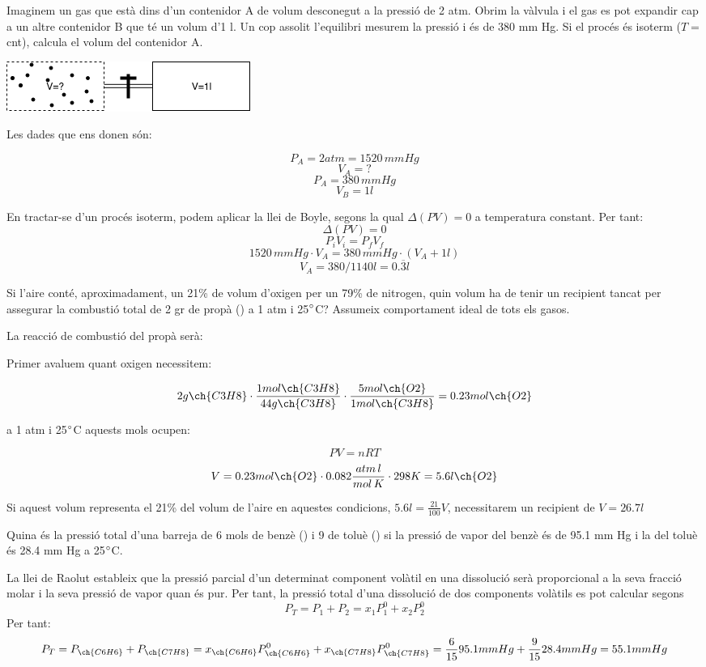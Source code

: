 \documentclass[11pt]{article}
\begin{document}
{Imaginem un gas que està dins d'un contenidor A de volum desconegut a la pressió de 2 atm. Obrim la vàlvula i el gas es pot expandir cap a un altre contenidor B que té un volum d'1 l. Un cop assolit l'equilibri mesurem la pressió i és de 380 mm Hg. Si el procés és isoterm ($T=$cnt), calcula el volum del contenidor A.
\begin{center}
\includegraphics[scale=0.7]{../figures/gas.png}
\end{center}}
{
\vfill
\newpage
}
{
Les dades que ens donen són:

\[P_A=2atm=1520 \,mmHg\]
\[V_A=?\]
\[P_A=380 \,mmHg\]
\[V_B=1l\]

En tractar-se d'un procés isoterm, podem aplicar la llei de Boyle, segons la qual $\Delta (PV)=0$ a temperatura constant.
Per tant:
\[\Delta (PV)=0\]
\[P_i V_i = P_f V_f\]
\[1520  \,mmHg \cdot V_A = 380  \,mmHg \cdot (V_A + 1 l)\]
\[V_A = 380/1140 l = 0.\overline{3} l\]
}

{Si l'aire conté, aproximadament, un 21\% de volum d'oxigen per un 79\% de nitrogen, quin volum ha de tenir un recipient tancat per assegurar la combustió total de 2 gr de propà () a 1 atm i 25$\degree$C? Assumeix comportament ideal de tots els gasos.
}
{
\vfill
\newpage
}
{
La reacció de combustió del propà serà:


Primer avaluem quant oxigen necessitem:

\[2 g \ch{C3H8} \cdot \frac{1 mol \ch{C3H8}}{44 g \ch{C3H8}} \cdot \frac{5 mol \ch{O2}}{1 mol \ch{C3H8}}=0.23 mol \ch{O2}\]

a 1 atm i 25$\degree$C aquests mols ocupen:

\[PV=nRT\]
\[ V = 0.23mol \ch{O2} \cdot 0.082 \frac{atm \, l}{mol \, K} \cdot 298 K = 5.6l \ch{O2}\]

Si aquest volum representa el 21\% del volum de l'aire en aquestes condicions, $5.6l=\frac{21}{100}V$, necessitarem un recipient de $V=26.7l$
}

{Quina és la pressió total d'una barreja de 6 mols de benzè () i 9 de toluè () si la pressió de vapor del benzè és de 95.1 mm Hg i la del toluè és 28.4 mm Hg a 25$\degree$C. 
}
{
\vfill

}
{
La llei de Raolut estableix que la pressió parcial d'un determinat component volàtil en una dissolució serà proporcional a la seva fracció molar i la seva pressió de vapor quan és pur. Per tant, la pressió total d'una dissolució de dos components volàtils es pot calcular segons 
\[
P_T=P_1+P_2=x_1P_1^0+x_2P_2^0
\]
Per tant:
\[
P_T=P_{\ch{C6H6}}+P_{\ch{C7H8}}=x_{\ch{C6H6}}P_{\ch{C6H6}}^0+x_{\ch{C7H8}}P_{\ch{C7H8}}^0=\frac{6}{15}95.1 mm Hg+\frac{9}{15}28.4 mm Hg=55.1mmHg
\]
}


\problemsdone
\end{document}
